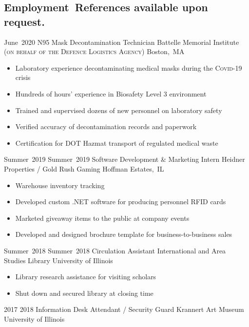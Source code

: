 \subsection*{Employment\hfill\ {\footnotesize References available upon request.}}
\secitemexperience
	{June~2020}
	{}
	{N95 Mask Decontamination Technician}
	{Battelle Memorial Institute {\scshape\footnotesize (on behalf of the Defence Logistics Agency)}}
	{Boston,~MA}
	{
		\begin{itemize}
			\vspace{-2mm}
			\item Laboratory experience decontaminating medical masks during the {\scshape Covid-19} crisis
			\item Hundreds of hours' experience in Biosafety Level 3 environment
			\item Trained and supervised dozens of new personnel on laboratory safety
			\item Verified accuracy of decontamination records and paperwork
			\item Certification for DOT Hazmat transport of regulated medical waste
			\vspace{-2mm}
		\end{itemize}
	}
\secitemexperience
	{Summer~2019}
	{Summer~2019}
	{Software Development \& Marketing Intern}
	{Heidner Properties / Gold Rush Gaming}
	{Hoffman Estates,~IL}
	{
		\begin{itemize}
			\vspace{-2mm}
			\item Warehouse inventory tracking
			\item Developed custom .NET software for producing personnel RFID cards
			\item Marketed giveaway items to the public at company events
			\item Developed and designed brochure template for business-to-business sales
			\vspace{-2mm}
		\end{itemize}
	}
\secitemexperience
	{Summer~2018}
	{Summer~2018}
	{Circulation Assistant}
	{International and Area Studies Library}
	{University of Illinois}
	{
		\begin{itemize}
			\vspace{-2mm}
			\item Library research assistance for visiting scholars
			\item Shut down and secured library at closing time
			\vspace{-2mm}
		\end{itemize}
	}
\secitemexperience
	{2017}
	{2018}
	{Information Desk Attendant / Security Guard}
	{Krannert Art Museum}
	{University of Illinois}
    {%
    }
	
